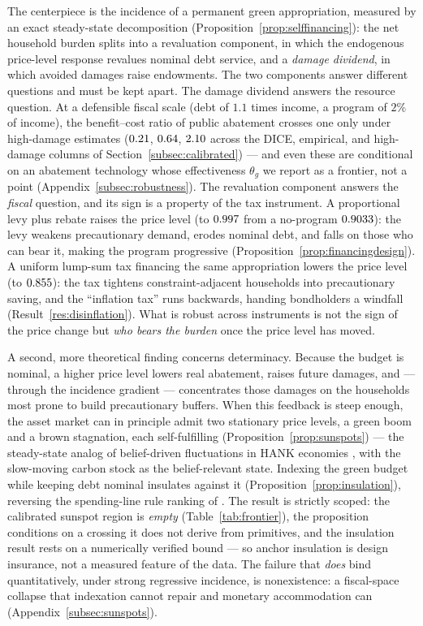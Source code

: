 \documentclass[12pt]{article}
\begin{document}
The centerpiece is the incidence of a permanent green appropriation, measured
by an exact steady-state decomposition
(Proposition~\ref{prop:selffinancing}): the net household burden splits into
a revaluation component, in which the endogenous price-level response
revalues nominal debt service, and a \emph{damage dividend}, in which avoided
damages raise endowments. The two components answer different questions and
must be kept apart. The damage dividend answers the resource question.
At a defensible fiscal scale (debt of $1.1$ times income, a program of $2\%$
of income), the benefit--cost ratio of public abatement crosses one only
under high-damage estimates ($0.21$, $0.64$, $2.10$ across the
DICE, empirical, and high-damage columns of
Section~\ref{subsec:calibrated}) --- and even these are conditional on an
abatement technology whose effectiveness $\theta_g$ we report as a frontier,
not a point (Appendix~\ref{subsec:robustness}). The revaluation component
answers the \emph{fiscal} question, and its sign is a property of the tax
instrument. A proportional levy plus rebate raises the price level (to
$0.997$ from a no-program $0.9033$): the levy weakens precautionary
demand, erodes nominal debt, and falls on those who can bear it, making the
program progressive (Proposition~\ref{prop:financingdesign}). A uniform
lump-sum tax financing the same appropriation lowers the price
level (to $0.855$): the tax tightens constraint-adjacent households into
precautionary saving, and the ``inflation tax'' runs backwards, handing
bondholders a windfall (Result~\ref{res:disinflation}). What is robust across
instruments is not the sign of the price change but \emph{who bears the
burden} once the price level has moved.

A second, more theoretical finding concerns determinacy. Because the budget
is nominal, a higher price level lowers real abatement, raises future
damages, and --- through the incidence gradient --- concentrates those damages
on the households most prone to build precautionary buffers. When this
feedback is steep enough, the asset market can in principle admit two
stationary price levels, a green boom and a brown stagnation, each
self-fulfilling (Proposition~\ref{prop:sunspots}) --- the steady-state analog
of belief-driven fluctuations in HANK economies \citep{acharyabenhabib2024},
with the slow-moving carbon stock as the belief-relevant state. Indexing the
green budget while keeping debt nominal insulates against it
(Proposition~\ref{prop:insulation}), reversing the spending-line rule ranking
of \citet{hagedorn2026dtpl}. The result is strictly scoped: the calibrated
sunspot region is \emph{empty} (Table~\ref{tab:frontier}), the proposition
conditions on a crossing it does not derive from primitives, and the
insulation result rests on a numerically verified bound --- so anchor
insulation is design insurance, not a measured feature of the data. The
failure that \emph{does} bind quantitatively, under strong regressive
incidence, is nonexistence: a fiscal-space collapse that indexation cannot
repair and monetary accommodation can
(Appendix~\ref{subsec:sunspots}).
\end{document}
